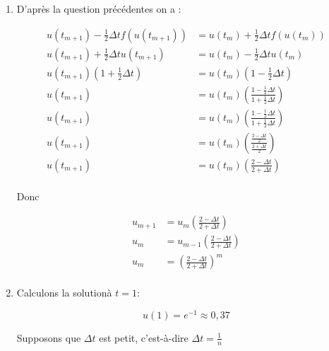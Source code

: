 \documentclass[12pt, letterpaper]{article}
\begin{document}
\begin{enumerate}
\item

  D'après la question précédentes on a :

  \begin{equation*}
    \begin{split}
        u(t_{m + 1}) - \frac{1}{2} \Delta t f(u(t_{m+1})) & = u(t_m) +
        \frac{1}{2} \Delta t f(u(t_m)) \\
        u(t_{m + 1}) + \frac{1}{2} \Delta t u(t_{m+1}) & = u(t_m) -
        \frac{1}{2} \Delta t u(t_m) \\
        u(t_{m + 1}) \left(1 + \frac{1}{2} \Delta t \right) & = u(t_m) \left( 1 -
        \frac{1}{2} \Delta t \right) \\
        u(t_{m + 1})  & = u(t_m) \left( \frac{1 - \frac{1}{2} \Delta
          t}{1 + \frac{1}{2} \Delta t} \right) \\
        u(t_{m + 1})  & = u(t_m) \left( \frac{1 - \frac{1}{2} \Delta
          t}{1 + \frac{1}{2} \Delta t} \right) \\
        u(t_{m + 1})  & = u(t_m) \left( \frac{\frac{2 - \Delta
          t}{2} }{\frac{2 + \Delta t}{2}} \right) \\
        u(t_{m + 1})  & = u(t_m) \left( \frac{2 - \Delta
          t}{2 + \Delta t} \right) \\
    \end{split}
  \end{equation*}

  Donc

  \begin{equation*}
    \begin{split}
      u_{m + 1}  & = u_m \left( \frac{2 - \Delta
        t}{2 + \Delta t} \right) \\
      u_m  & = u_{m-1} \left( \frac{2 - \Delta
        t}{2 + \Delta t} \right) \\
      u_m  & = \left( \frac{2 - \Delta
        t}{2 + \Delta t} \right)^m \\
    \end{split}
  \end{equation*}

\item

  Calculons la solutionà $t = 1$:

  \begin{equation*}
    u(1) = e^{-1} \approx 0,37
  \end{equation*}

  Supposons que $\Delta t$ est petit, c'est-à-dire $\Delta t =
  \frac{1}{n}$ \newline


\end{enumerate}
\end{document}
